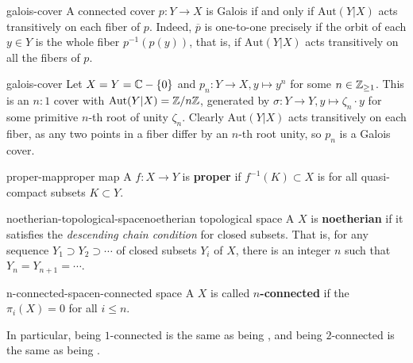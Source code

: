 \begin{example}{galois-cover}
    A connected cover $p : Y \to X$ is Galois if and only if $\text{Aut}(Y|X)$ acts transitively on each fiber of $p$. Indeed, $\overline{p}$ is one-to-one precisely if the orbit of each $y \in Y$ is the whole fiber $p^{-1}(p(y))$, that is, if $\text{Aut}(Y|X)$ acts transitively on all the fibers of $p$.
\end{example}

\begin{example}{galois-cover}
    Let $X = Y = \mathbb{C} - \{ 0 \}$ and $p_n : Y \to X, y \mapsto y^n$ for some $n \in \mathbb{Z}_{\ge 1}$. This is an $n : 1$ cover with $\text{Aut}(Y|X) = \mathbb{Z}/n\mathbb{Z}$, generated by $\sigma : Y \to Y, y \mapsto \zeta_n \cdot y$ for some primitive $n$-th root of unity $\zeta_n$. Clearly $\text{Aut}(Y|X)$ acts transitively on each fiber, as any two points in a fiber differ by an $n$-th root unity, so $p_n$ is a Galois cover.
\end{example}

\begin{topic}{proper-map}{proper map}
    A  $f : X \to Y$ is \textbf{proper} if $f^{-1}(K) \subset X$ is  for all quasi-compact subsets $K \subset Y$.
\end{topic}

\begin{topic}{noetherian-topological-space}{noetherian topological space}
    A  $X$ is \textbf{noetherian} if it satisfies the \textit{descending chain condition} for closed subsets. That is, for any sequence $Y_1 \supset Y_2 \supset \cdots$ of closed subsets $Y_i$ of $X$, there is an integer $n$ such that $Y_n = Y_{n + 1} = \cdots$.
\end{topic}

\begin{topic}{n-connected-space}{n-connected space}
    A  $X$ is called \textbf{$n$-connected} if the  $\pi_i(X) = 0$ for all $i \le n$.
    
    In particular, being $1$-connected is the same as being , and being $2$-connected is the same as being .
\end{topic}


